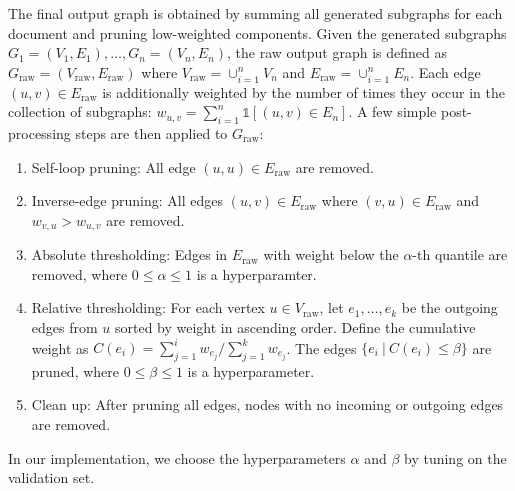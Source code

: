 The final output graph is obtained by summing all generated subgraphs for each document and pruning low-weighted components. Given the generated subgraphs $G_1 = (V_1, E_1), \dots, G_n = (V_n, E_n)$, the raw output graph is defined as $G_{\text{raw}} = (V_{\text{raw}}, E_{\text{raw}})$ where $V_\text{raw} = \cup_{i=1}^n V_n$ and $E_\text{raw} = \cup_{i=1}^n E_n$. Each edge $(u, v) \in E_\text{raw}$ is additionally weighted by the number of times they occur in the collection of subgraphs: $w_{u, v} = \sum_{i=1}^n \mathbb{1}[(u,v) \in E_n]$. A few simple post-processing steps are then applied to $G_\text{raw}$:
\begin{enumerate}
    \item Self-loop pruning: All edge $(u, u) \in E_\text{raw}$ are removed.
    \item Inverse-edge pruning: All edges $(u, v) \in E_\text{raw}$ where $(v, u) \in E_\text{raw}$ and $w_{v, u} > w_{u, v}$ are removed.
    \item Absolute thresholding: Edges in $E_\text{raw}$ with weight below the $\alpha$-th quantile are removed, where $0 \leq \alpha \leq 1$ is a hyperparamter.
    \item Relative thresholding: For each vertex $u \in V_\text{raw}$, let $e_1, \dots, e_k$ be the outgoing edges from $u$ sorted by weight in ascending order. Define the cumulative weight as $C(e_i) = \sum_{j=1}^i w_{e_j} / \sum_{j=1}^k w_{e_j}$. The edges $\{e_i\ |\ C(e_i) \leq \beta\}$ are pruned, where $0 \leq \beta \leq 1$ is a hyperparameter.
    \item Clean up: After pruning all edges, nodes with no incoming or outgoing edges are removed.
\end{enumerate}
In our implementation, we choose the hyperparameters $\alpha$ and $\beta$ by tuning on the validation set.


